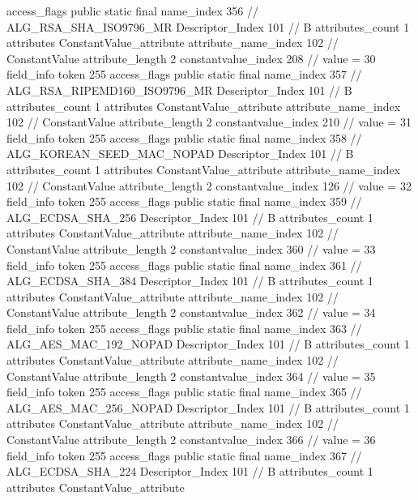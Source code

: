 {{{{{				access_flags	public static final
				name_index	356		// ALG_RSA_SHA_ISO9796_MR
				Descriptor_Index	101		// B
				attributes_count	1
				attributes {
				ConstantValue_attribute {
					attribute_name_index	102		// ConstantValue
					attribute_length	2
					constantvalue_index	208		// value = 30
				}
				}
			}
			field_info {
				token	255
				access_flags	public static final
				name_index	357		// ALG_RSA_RIPEMD160_ISO9796_MR
				Descriptor_Index	101		// B
				attributes_count	1
				attributes {
				ConstantValue_attribute {
					attribute_name_index	102		// ConstantValue
					attribute_length	2
					constantvalue_index	210		// value = 31
				}
				}
			}
			field_info {
				token	255
				access_flags	public static final
				name_index	358		// ALG_KOREAN_SEED_MAC_NOPAD
				Descriptor_Index	101		// B
				attributes_count	1
				attributes {
				ConstantValue_attribute {
					attribute_name_index	102		// ConstantValue
					attribute_length	2
					constantvalue_index	126		// value = 32
				}
				}
			}
			field_info {
				token	255
				access_flags	public static final
				name_index	359		// ALG_ECDSA_SHA_256
				Descriptor_Index	101		// B
				attributes_count	1
				attributes {
				ConstantValue_attribute {
					attribute_name_index	102		// ConstantValue
					attribute_length	2
					constantvalue_index	360		// value = 33
				}
				}
			}
			field_info {
				token	255
				access_flags	public static final
				name_index	361		// ALG_ECDSA_SHA_384
				Descriptor_Index	101		// B
				attributes_count	1
				attributes {
				ConstantValue_attribute {
					attribute_name_index	102		// ConstantValue
					attribute_length	2
					constantvalue_index	362		// value = 34
				}
				}
			}
			field_info {
				token	255
				access_flags	public static final
				name_index	363		// ALG_AES_MAC_192_NOPAD
				Descriptor_Index	101		// B
				attributes_count	1
				attributes {
				ConstantValue_attribute {
					attribute_name_index	102		// ConstantValue
					attribute_length	2
					constantvalue_index	364		// value = 35
				}
				}
			}
			field_info {
				token	255
				access_flags	public static final
				name_index	365		// ALG_AES_MAC_256_NOPAD
				Descriptor_Index	101		// B
				attributes_count	1
				attributes {
				ConstantValue_attribute {
					attribute_name_index	102		// ConstantValue
					attribute_length	2
					constantvalue_index	366		// value = 36
				}
				}
			}
			field_info {
				token	255
				access_flags	public static final
				name_index	367		// ALG_ECDSA_SHA_224
				Descriptor_Index	101		// B
				attributes_count	1
				attributes {
				ConstantValue_attribute {
}}}}}}}
